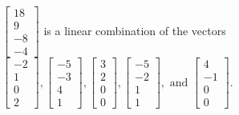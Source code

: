 \begin{exercise}
\begin{exerciseStatement}
  \end{exerciseStatement}
  \begin{exerciseAnswer}
   \(\left[\begin{array}{c}
18 \\
9 \\
-8 \\
-4
\end{array}\right]\) 
  	 is  
	a linear combination of the vectors \(\left[\begin{array}{c}
-2 \\
1 \\
0 \\
2
\end{array}\right] , \left[\begin{array}{c}
-5 \\
-3 \\
4 \\
1
\end{array}\right] , \left[\begin{array}{c}
3 \\
2 \\
0 \\
0
\end{array}\right] , \left[\begin{array}{c}
-5 \\
-2 \\
1 \\
1
\end{array}\right] , \text{ and } \left[\begin{array}{c}
4 \\
-1 \\
0 \\
0
\end{array}\right]\).

	
  


  \end{exerciseAnswer}
\end{exercise}